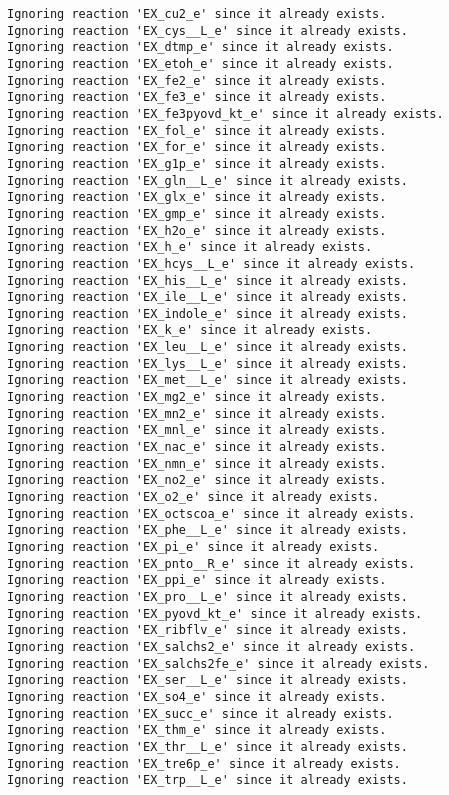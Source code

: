 \documentclass[
  letterpaper,
  DIV=11,
  numbers=noendperiod]{scrartcl}
\begin{document}
\begin{verbatim}
Ignoring reaction 'EX_cu2_e' since it already exists.
Ignoring reaction 'EX_cys__L_e' since it already exists.
Ignoring reaction 'EX_dtmp_e' since it already exists.
Ignoring reaction 'EX_etoh_e' since it already exists.
Ignoring reaction 'EX_fe2_e' since it already exists.
Ignoring reaction 'EX_fe3_e' since it already exists.
Ignoring reaction 'EX_fe3pyovd_kt_e' since it already exists.
Ignoring reaction 'EX_fol_e' since it already exists.
Ignoring reaction 'EX_for_e' since it already exists.
Ignoring reaction 'EX_g1p_e' since it already exists.
Ignoring reaction 'EX_gln__L_e' since it already exists.
Ignoring reaction 'EX_glx_e' since it already exists.
Ignoring reaction 'EX_gmp_e' since it already exists.
Ignoring reaction 'EX_h2o_e' since it already exists.
Ignoring reaction 'EX_h_e' since it already exists.
Ignoring reaction 'EX_hcys__L_e' since it already exists.
Ignoring reaction 'EX_his__L_e' since it already exists.
Ignoring reaction 'EX_ile__L_e' since it already exists.
Ignoring reaction 'EX_indole_e' since it already exists.
Ignoring reaction 'EX_k_e' since it already exists.
Ignoring reaction 'EX_leu__L_e' since it already exists.
Ignoring reaction 'EX_lys__L_e' since it already exists.
Ignoring reaction 'EX_met__L_e' since it already exists.
Ignoring reaction 'EX_mg2_e' since it already exists.
Ignoring reaction 'EX_mn2_e' since it already exists.
Ignoring reaction 'EX_mnl_e' since it already exists.
Ignoring reaction 'EX_nac_e' since it already exists.
Ignoring reaction 'EX_nmn_e' since it already exists.
Ignoring reaction 'EX_no2_e' since it already exists.
Ignoring reaction 'EX_o2_e' since it already exists.
Ignoring reaction 'EX_octscoa_e' since it already exists.
Ignoring reaction 'EX_phe__L_e' since it already exists.
Ignoring reaction 'EX_pi_e' since it already exists.
Ignoring reaction 'EX_pnto__R_e' since it already exists.
Ignoring reaction 'EX_ppi_e' since it already exists.
Ignoring reaction 'EX_pro__L_e' since it already exists.
Ignoring reaction 'EX_pyovd_kt_e' since it already exists.
Ignoring reaction 'EX_ribflv_e' since it already exists.
Ignoring reaction 'EX_salchs2_e' since it already exists.
Ignoring reaction 'EX_salchs2fe_e' since it already exists.
Ignoring reaction 'EX_ser__L_e' since it already exists.
Ignoring reaction 'EX_so4_e' since it already exists.
Ignoring reaction 'EX_succ_e' since it already exists.
Ignoring reaction 'EX_thm_e' since it already exists.
Ignoring reaction 'EX_thr__L_e' since it already exists.
Ignoring reaction 'EX_tre6p_e' since it already exists.
Ignoring reaction 'EX_trp__L_e' since it already exists.

\end{verbatim}
\end{document}
